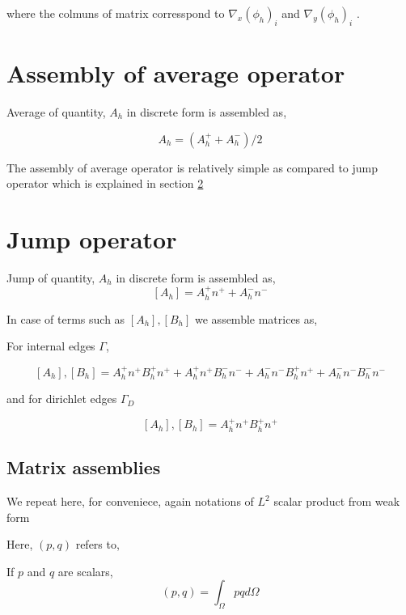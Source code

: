 \documentclass[a4paper,10pt]{book}
\begin{document}
where the colmuns of matrix corresspond to $\nabla_x (\phi_h)_{i}$ and $\nabla_y (\phi_h)_{i}$ .

\section{Assembly of average operator}

Average of quantity, $A_h$ in discrete form is assembled as,

\begin{equation}\label{Average operator}
{A_h} = (A_h^+ + A_h^-)/2
\end{equation}

The assembly of average operator is relatively simple as compared to jump operator which is explained in section \ref{Jump operator}

\section{Jump operator} \label{Jump operator}

Jump of quantity, $A_h$ in discrete form is assembled as,
\begin{equation} \label{Jump_operator}
[A_h] = A_h^+ n^+ + A_h^- n^-
\end{equation}

In case of terms such as $[A_h],[B_h]$ we assemble matrices as, 

For internal edges $\Gamma$,

\begin{equation} \label{Jump operator L2}
[A_h],[B_h] = A_h^+ n^+ B_h^+ n^+ + A_h^+ n^+ B_h^- n^- + A_h^- n^- B_h^+ n^+ + A_h^- n^- B_h^- n^-
\end{equation}

and for dirichlet edges $\Gamma_D$

\begin{equation} \label{Jump operator L2 for dirichlet}
[A_h],[B_h] = A_h^+ n^+ B_h^+ n^+ 
\end{equation}


\subsection{Matrix assemblies}

We repeat here, for conveniece, again notations of $L^2$ scalar product from weak form

Here, $(p,q)$ refers to,

If $p$ and $q$ are scalars,
\begin{equation}\label{inner product scalars}
(p,q)=\int_{\Omega} pq d \Omega 
\end{equation}
\end{document}

